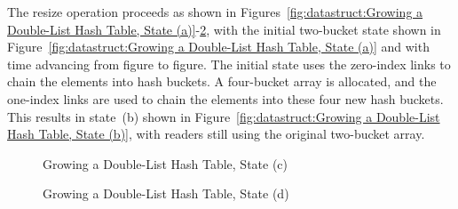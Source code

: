 The resize operation proceeds as shown in
Figures~\ref{fig:datastruct:Growing a Double-List Hash Table, State (a)}-\ref{fig:datastruct:Growing a Double-List Hash Table, State (d)},
with the initial two-bucket state shown in
Figure~\ref{fig:datastruct:Growing a Double-List Hash Table, State (a)}
and with time advancing from figure to figure.
The initial state uses the zero-index links to chain the elements into
hash buckets.
A four-bucket array is allocated, and the one-index links are used to
chain the elements into these four new hash buckets.
This results in state~(b) shown in
Figure~\ref{fig:datastruct:Growing a Double-List Hash Table, State (b)},
with readers still using the original two-bucket array.

\begin{figure}[tb]
\centering
{}
\caption{Growing a Double-List Hash Table, State (c)}
\label{fig:datastruct:Growing a Double-List Hash Table, State (c)}
\end{figure}

\begin{figure}[tb]
\centering
{}
\caption{Growing a Double-List Hash Table, State (d)}
\label{fig:datastruct:Growing a Double-List Hash Table, State (d)}
\end{figure}

